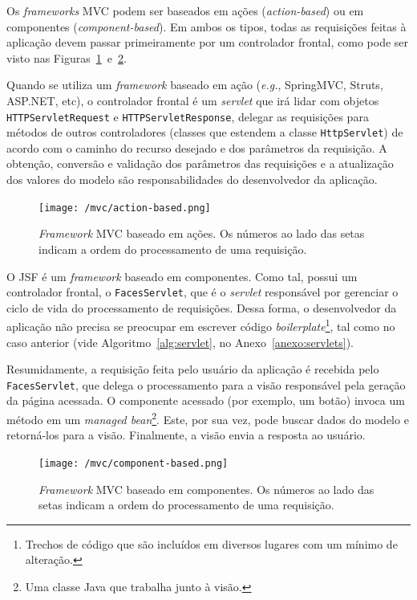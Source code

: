 \documentclass[
  10.5pt,				  %
	openright,			%
	twoside,			  %
  a5paper,
  chapter=TITLE,	%
	section=TITLE,	%
  hyphens,        %
	english,        %
	brazil          %
]{abntex2}
\begin{document}
Os \emph{frameworks} MVC podem ser baseados em ações (\emph{action-based}) ou em componentes (\emph{component-based}). Em ambos os tipos, todas as requisições feitas à aplicação devem passar primeiramente por um controlador frontal, como pode ser visto nas Figuras~\ref{fig:mvc-push}~e~\ref{fig:mvc-pull}.

Quando se utiliza um \emph{framework} baseado em ação (\emph{e.g.}, SpringMVC, Struts, ASP.NET, etc), o controlador frontal é um \emph{servlet} que irá lidar com objetos \texttt{HTTPServletRequest} e \texttt{HTTPServletResponse}, delegar as requisições para métodos de outros controladores (classes que estendem a classe \texttt{HttpServlet}) de acordo com o caminho do recurso desejado e dos parâmetros da requisição. A obtenção, conversão e validação dos parâmetros das requisições e a atualização dos valores do modelo são responsabilidades do desenvolvedor da aplicação.

\begin{figure}[!ht]
  \caption{\label{fig:mvc-push}\emph{Framework} MVC baseado em ações. Os números ao lado das setas indicam a ordem do processamento de uma requisição.}
  \begin{center}
    \texttt{[image: /mvc/action-based.png]}
  \end{center}
\end{figure}

O JSF é um \emph{framework} baseado em componentes. Como tal, possui um controlador frontal, o \texttt{FacesServlet}, que é o \emph{servlet} responsável por gerenciar o ciclo de vida do processamento de requisições. Dessa forma, o desenvolvedor da aplicação não precisa se preocupar em escrever código \emph{boilerplate}\footnote{Trechos de código que são incluídos em diversos lugares com um mínimo de alteração.}, tal como no caso anterior (vide Algoritmo~\ref{alg:servlet}, no Anexo~\ref{anexo:servlets}).

Resumidamente, a requisição feita pelo usuário da aplicação é recebida pelo \texttt{FacesServlet}, que delega o processamento para a visão responsável pela geração da página acessada. O componente acessado (por exemplo, um botão) invoca um método em um \emph{managed bean}\footnote{Uma classe Java que trabalha junto à visão.}. Este, por sua vez, pode buscar dados do modelo e retorná-los para a visão. Finalmente, a visão envia a resposta ao usuário.

\begin{figure}[!ht]
  \caption{\label{fig:mvc-pull}\emph{Framework} MVC baseado em componentes. Os números ao lado das setas indicam a ordem do processamento de uma requisição.}
  \begin{center}
    \texttt{[image: /mvc/component-based.png]}
  \end{center}
\end{figure}
\end{document}
